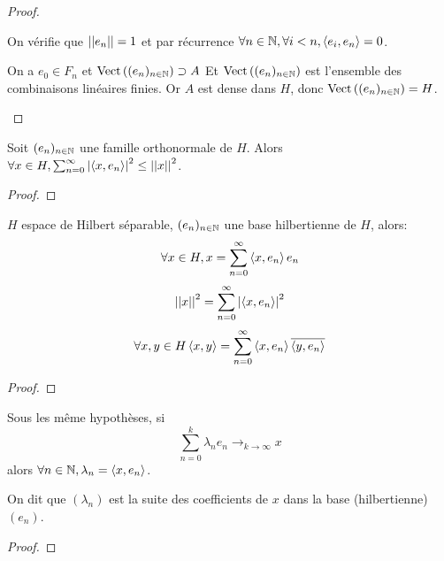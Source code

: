 \begin{proof}
\begin{itemize}
		      On vérifie que $\left|\left|e_n\right|\right| = 1$ et par récurrence $\forall n \in \mathbb{N}, \forall i < n, \left\langle e_i, e_n \right\rangle = 0$.


		      On a $e_0 \in F_n$ et $\text{Vect}\left( (e_n)_{n\in \mathbb{N}} \right) \supset A$ Et $\text{Vect}\left( (e_n)_{n\in \mathbb{N}} \right)$ est l'ensemble des combinaisons linéaires finies. Or $A$ est dense dans $H$, donc
		      $\text{Vect}\left( (e_n)_{n\in \mathbb{N}} \right) = H$.
	\end{itemize}
\end{proof}


\begin{prop}
	Soit $(e_n)_{n\in \mathbb{N}}$ une famille orthonormale de $H$.
	Alors $\forall x \in H, \sum_{n=0}^{\infty} \left|\left\langle x, e_n \right\rangle\right|^2 \leq \left|\left|x\right|\right|^2$.
\end{prop}


\begin{proof}
\end{proof}


\begin{prop}
	$H$ espace de Hilbert séparable, $(e_n)_{n\in \mathbb{N}}$ une base hilbertienne de $H$,
	alors:
	$$ \forall x \in H, x = \sum_{n=0}^{\infty} \left\langle x, e_n \right\rangle e_n $$
	$$ {\left|\left|x\right|\right|}^2 = \sum_{n=0}^{\infty} \left|\left\langle x, e_n \right\rangle\right|^2 $$
	$$ \forall x,y \in H \left\langle x, y \right\rangle = \sum_{n=0}^{\infty} \left\langle x, e_n \right\rangle \overline{\left\langle y, e_n \right\rangle} $$
\end{prop}

\begin{proof}
\end{proof}



\begin{prop}
	Sous les même hypothèses, si
	$$ \sum_{n=0}^{k} \lambda_n e_n \to_{k\to \infty} x $$
	alors $\forall n \in \mathbb{N}, \lambda_n = \left\langle x, e_n \right\rangle$.

	On dit que $(\lambda_n)$ est la suite des coefficients de $x$ dans la base (hilbertienne) $(e_n)$.
\end{prop}


\begin{proof}
\end{proof}

